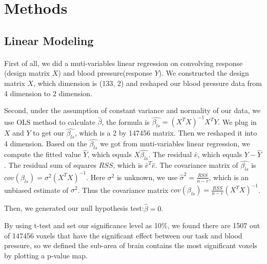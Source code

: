 \documentclass[11pt]{article}
\begin{document}
\section{Methods}
\subsection{Linear Modeling}
\paragraph{}
First of all, we did a muti-variables linear regression on convolving response 
(design matrix $X$) and blood pressure(response $Y$). We constructed the design 
matrix $X$, which dimension is (133, 2) and reshaped our blood pressure data from 
4 dimension to 2 dimension.\par
Second, under the assumption of constant variance and normality of our data, we 
use OLS method to calculate $\hat{\beta}$, the formula is 
$\hat{\beta_{ls}}=(X^{T}X)^{-1}X^{T}Y$. We plug in $X$ and $Y$ to get
our $\hat{\beta_{ls}}$, which is a 2 by 147456 matrix. Then we reshaped it into 
4 dimension. Based on the $\hat{\beta_{ls}}$ we got from muti-variables linear 
regression, we compute the fitted value $\hat{Y}$, which equals 
$X\hat{\beta_{ls}}$. The residual $\hat{e}$, which equals $Y-\hat{Y}$. The 
residual sum of squares $RSS$, which is $\hat{e}^{T}\hat{e}$. The covariance
matrix of $\hat{\beta_{ls}}$ is $cov(\beta_{ls}) = \sigma^2(X^{T}X)^{-1}$. Here $\sigma^2$
is unknown, we use $\hat{\sigma}^2 = \frac{RSS}{n-r}$, which is an unbiased 
estimate of $\sigma^2$. Thus the covariance matrix 
$cov(\beta_{ls}) = \frac{RSS}{n-r}(X^{T}X)^{-1}$. \par
Then, we generated our null hypothesis test:$\hat{\beta} = 0$.\par
By using t-test and set our significance level as 10\%, we found there are 1507 
out of 147456 voxels that have the significant effect between our task and 
blood pressure, so we defined the sub-area of brain contains the most 
significant voxels by plotting a p-value map.
\end{document}
